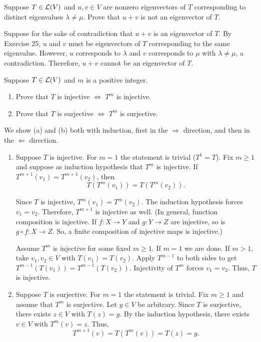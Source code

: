 \begin{xrcs}
  Suppose $T \in \mathcal{L}(V)$ and $u, v \in V$ are nonzero eigenvectors of $T$ corresponding to distinct eigenvalues $\lambda \neq \mu$. Prove that $u+v$ is not an eigenvector of $T$.

  \begin{xprf}
    Suppose for the sake of contradiction that $u+v$ is an eigenvector of $T$.
    By Exercise 25, $u$ and $v$ must be eigenvectors of $T$ corresponding to the same eigenvalue.
    However, $u$ corresponds to $\lambda$ and $v$ corresponds to $\mu$ with $\lambda \neq \mu$, a contradiction.
    Therefore, $u+v$ cannot be an eigenvector of $T$.
  \end{xprf}
\end{xrcs}

\begin{xrcs}
  Suppose $T \in \mathcal{L}(V)$ and $m$ is a positive integer.
  \begin{enumerate}
    \item Prove that $T$ is injective $\iff$ $T^m$ is injective.
    \item Prove that $T$ is surjective $\iff$ $T^m$ is surjective.
  \end{enumerate}

  \begin{xprf}
    We show (a) and (b) both with induction, first in the $\Rightarrow$ direction, and then in the $\Leftarrow$ direction.
    \begin{enumerate}
      \item {
        \Rightarrowdirection Suppose $T$ is injective. For $m=1$ the statement is trivial ($T^1 = T$). Fix  $m \geq 1$ and suppose as induction hypothesis that $T^m$ is injective. If $T^{m+1}(v_1) = T^{m+1} (v_2)$, then
        \begin{equation}
          T(T^{m}(v_1)) = T(T^{m} (v_2)).
        \end{equation}

        Since $T$ is injective, $T^{m}(v_1) = T^{m} (v_2)$. The induction hypothesis forces $v_1 = v_2$. Therefore, $T^{m+1}$ is injective as well. (In general, function composition is injective. If $f: X \to Y$ and $g: Y \to Z$ are injective, so is $g \circ f : X \to Z$. So, a finite composition of injective maps is injective.)

        \Leftarrowdirection Assume $T^m$ is injective for some fixed $m \geq 1$. If $m=1$ we are done. If $m>1$, take $v_1, v_2 \in V$ with $T(v_1) = T(v_2)$. Apply $T^{m-1}$ to both sides to get $T^{m-1} (T(v_1)) = T^{m-1} (T(v_2))$. Injectivity of $T^{m}$ forces $v_1 = v_2$. Thus, $T$ is injective.
      }
      \item{
        \Rightarrowdirection Suppose $T$ is surjective. For $m=1$ the statement is trivial. Fix $m \geq 1$ and assume that $T^m$ is surjective. Let $y\in V$ be arbitrary. Since $T$ is surjective, there exists $z\in V$ with $T(z)=y$. By the induction hypothesis, there exists $v\in V$ with $T^m(v)=z$. Thus,
        \begin{equation}
          T^{m+1}(v)=T(T^m(v))=T(z)=y.
        \end{equation}

}
\end{enumerate}
\end{xprf}
\end{xrcs}
